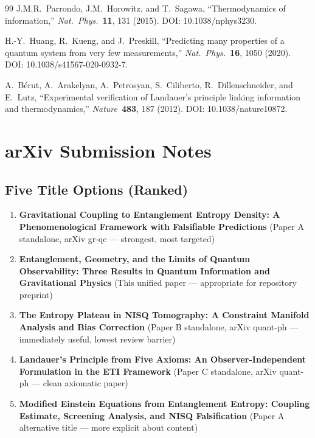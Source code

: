 \documentclass[12pt,letterpaper]{article}
\theoremstyle{plain}
\theoremstyle{definition}
\theoremstyle{remark}
\begin{document}
\begin{thebibliography}{99}
J.M.R.~Parrondo, J.M.~Horowitz, and T.~Sagawa,
``Thermodynamics of information,''
\textit{Nat.\ Phys.}~\textbf{11}, 131 (2015).
DOI: 10.1038/nphys3230.

H.-Y.~Huang, R.~Kueng, and J.~Preskill,
``Predicting many properties of a quantum system from very few
measurements,''
\textit{Nat.\ Phys.}~\textbf{16}, 1050 (2020).
DOI: 10.1038/s41567-020-0932-7.

A.~B\'erut, A.~Arakelyan, A.~Petrosyan, S.~Ciliberto,
R.~Dillenschneider, and E.~Lutz,
``Experimental verification of Landauer's principle linking
information and thermodynamics,''
\textit{Nature}~\textbf{483}, 187 (2012).
DOI: 10.1038/nature10872.

\end{thebibliography}

\newpage
\section*{arXiv Submission Notes}

\subsection*{Five Title Options (Ranked)}

\begin{enumerate}
  \item \textbf{Gravitational Coupling to Entanglement Entropy Density:
    A Phenomenological Framework with Falsifiable Predictions}
    (Paper A standalone, arXiv gr-qc --- strongest, most targeted)

  \item \textbf{Entanglement, Geometry, and the Limits of Quantum
    Observability: Three Results in Quantum Information and
    Gravitational Physics}
    (This unified paper --- appropriate for repository preprint)

  \item \textbf{The Entropy Plateau in NISQ Tomography: A Constraint
    Manifold Analysis and Bias Correction}
    (Paper B standalone, arXiv quant-ph --- immediately useful,
    lowest review barrier)

  \item \textbf{Landauer's Principle from Five Axioms: An
    Observer-Independent Formulation in the ETI Framework}
    (Paper C standalone, arXiv quant-ph --- clean axiomatic paper)

  \item \textbf{Modified Einstein Equations from Entanglement Entropy:
    Coupling Estimate, Screening Analysis, and NISQ Falsification}
    (Paper A alternative title --- more explicit about content)
\end{enumerate}
\end{document}
